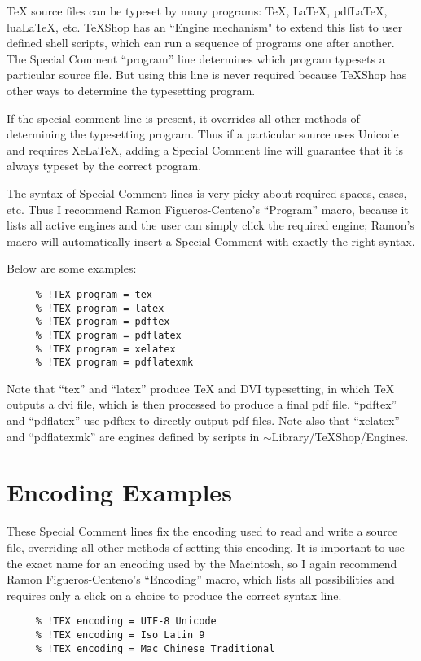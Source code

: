 \documentclass[11pt, oneside]{article}   	%
\begin{document}
TeX source files can be typeset by many programs: TeX, LaTeX, pdfLaTeX, luaLaTeX, etc. TeXShop has an ``Engine mechanism" to extend this list to user defined shell scripts, which can run a sequence of programs one after another. The Special Comment ``program'' line determines which program typesets a particular source file. But using this line is never required because TeXShop has other ways to determine the typesetting program.

If the special comment line is present, it overrides all other methods of determining the typesetting program. Thus if a particular source uses Unicode and requires XeLaTeX, adding a Special Comment line will guarantee that it is always typeset by the correct program.

The syntax of Special Comment lines is very picky about required spaces, cases, etc. Thus I recommend 
Ramon Figueros-Centeno's ``Program'' macro, because it lists all active engines and the user can simply click the required engine; Ramon's macro will automatically insert a Special Comment with exactly the right syntax.

Below are some examples:

\begin{verbatim}
     % !TEX program = tex               
     % !TEX program = latex
     % !TEX program = pdftex
     % !TEX program = pdflatex
     % !TEX program = xelatex
     % !TEX program = pdflatexmk
\end{verbatim}

Note that ``tex'' and ``latex'' produce TeX and DVI typesetting, in which TeX outputs a dvi file, which is then processed to produce a final pdf file. ``pdftex'' and ``pdflatex'' use pdftex to directly output pdf files.
Note also that ``xelatex'' and ``pdflatexmk'' are engines defined by scripts in $\sim$Library/TeXShop/Engines.

\section{Encoding Examples}

These Special Comment lines fix the encoding used to read and write a source file, overriding all other methods of setting this encoding. It is important to use the exact name for an encoding used by the Macintosh, so I again recommend Ramon Figueros-Centeno's ``Encoding'' macro, which lists all possibilities and requires only a click on a choice to produce the correct syntax line.
 
 \begin{verbatim}    
     % !TEX encoding = UTF-8 Unicode
     % !TEX encoding = Iso Latin 9
     % !TEX encoding = Mac Chinese Traditional
 \end{verbatim}    
   
\end{document}
